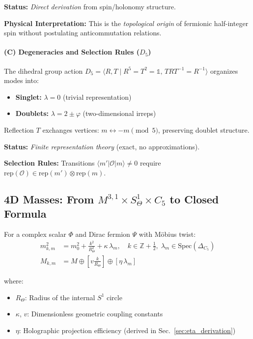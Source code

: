 \documentclass[12pt]{article}
\theoremstyle{definition}
\theoremstyle{plain}
\begin{document}
\textbf{Status:} \textit{Direct derivation} from spin/holonomy structure.

\textbf{Physical Interpretation:} This is the \textit{topological origin} of fermionic half-integer spin without postulating anticommutation relations.

\paragraph{(C) Degeneracies and Selection Rules ($D_5$)}

The dihedral group action $D_5 = \langle R, T \mid R^5 = T^2 = \mathbb{1},\, TRT^{-1} = R^{-1} \rangle$ organizes modes into:
\begin{itemize}
\item \textbf{Singlet:} $\lambda = 0$ (trivial representation)
\item \textbf{Doublets:} $\lambda = 2 \pm \varphi$ (two-dimensional irreps)
\end{itemize}

Reflection $T$ exchanges vertices: $m \leftrightarrow -m \pmod{5}$, preserving doublet structure.

\textbf{Status:} \textit{Finite representation theory} (exact, no approximations).

\textbf{Selection Rules:} Transitions $\langle m' | \mathcal{O} | m \rangle \neq 0$ require $\text{rep}(\mathcal{O}) \in \text{rep}(m') \otimes \text{rep}(m)$.

\subsection{4D Masses: From $M^{3,1} \times S^1_\Theta \times C_5$ to Closed Formula}

For a complex scalar $\Phi$ and Dirac fermion $\Psi$ with M\"obius twist:
\begin{align}
m^2_{k,m} &= m_0^2 + \frac{k^2}{R_\Theta^2} + \kappa \, \lambda_m, \quad k \in \mathbb{Z} + \tfrac{1}{2},\; \lambda_m \in \text{Spec}(\Delta_{C_5}) \label{eq:mass-scalar-full} \\
M_{k,m} &= M \oplus \left[v \frac{k}{R_\Theta}\right] \oplus \left[\eta \, \lambda_m\right] \label{eq:mass-fermion-full}
\end{align}

where:
\begin{itemize}
\item $R_\Theta$: Radius of the internal $S^1$ circle
\item $\kappa$, $v$: Dimensionless geometric coupling constants
\item $\eta$: Holographic projection efficiency (derived in Sec.~\ref{sec:eta_derivation})
\end{itemize}
\end{document}
